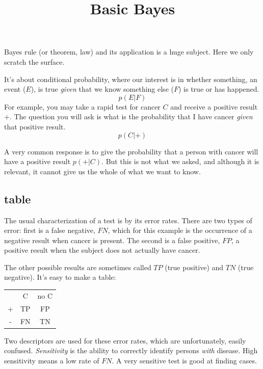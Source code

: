 \documentclass[11pt, oneside]{article}
\title{Basic Bayes}
\date{}
\begin{document}
\maketitle
\Large


Bayes rule (or theorem, law) and its application is a huge subject.  Here we only scratch the surface.  

It's about conditional probability, where our interest is in whether something, an event ($E$), is true \emph{given} that we know something else ($F$) is true or has happened.
\[ p(E | F) \]
For example, you may take a rapid test for cancer $C$ and receive a positive result $+$.  The question you will ask is what is the probability that I have cancer \emph{given} that positive result.
\[ p(C | +) \]

A very common response is to give the probability that a person with cancer will have a positive result $p(+ | C)$.  But this is not what we asked, and although it is relevant, it cannot give us the whole of what we want to know.

\subsection*{table}

The usual characterization of a test is by its error rates.  There are two types of error:  first is a false negative, $FN$, which for this example is the occurrence of a negative result when cancer is present.  The second is a false positive, $FP$, a positive result when the subject does not actually have cancer.

The other possible results are sometimes called $TP$ (true positive) and $TN$ (true negative).  It's easy to make a table:
\begin{center}
\begin{tabular}{ |c|c|c| } 
 \hline
   & C & no C \\ 
 + & TP & FP  \\ 
 - & FN & TN  \\  
 \hline
\end{tabular}
\end{center}

Two descriptors are used for these error rates, which are unfortunately, easily confused.  \emph{Sensitivity} is the ability to correctly identify persons \emph{with} disease.  High sensitivity means a low rate of $FN$.  A very sensitive test is good at finding cases.
\end{document}
